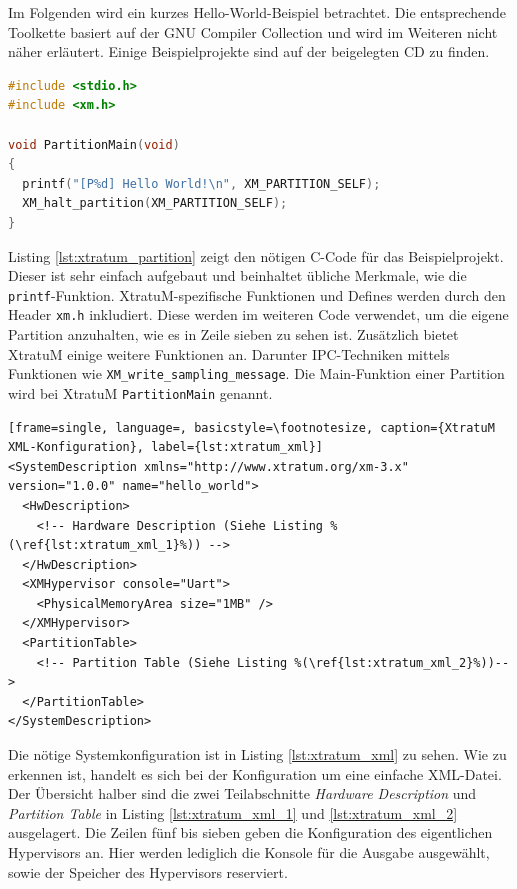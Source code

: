 \documentclass[
  a4paper,					    %
  twoside,
  DIV=calc,     				%
  bibliography=totoc,
  cleardoublepage=empty,
  ngerman,     					%
  final       					%
]{scrbook}
\begin{document}
Im Folgenden wird ein kurzes Hello-World-Beispiel betrachtet. Die entsprechende Toolkette basiert auf der GNU Compiler Collection und wird im Weiteren nicht näher erläutert. Einige Beispielprojekte sind auf der beigelegten CD zu finden.

\begin{lstlisting}[frame=single, language=C, basicstyle=\footnotesize, caption={XtratuM Beispiel Partition}, label={lst:xtratum_partition}]
#include <stdio.h>
#include <xm.h>

void PartitionMain(void)
{
  printf("[P%d] Hello World!\n", XM_PARTITION_SELF);
  XM_halt_partition(XM_PARTITION_SELF);
}
\end{lstlisting}

Listing \ref{lst:xtratum_partition} zeigt den nötigen C-Code für das Beispielprojekt. Dieser ist sehr einfach aufgebaut und beinhaltet übliche Merkmale, wie die \texttt{printf}-Funktion. XtratuM-spezifische Funktionen und Defines werden durch den Header \texttt{xm.h} inkludiert. Diese werden im weiteren Code verwendet, um die eigene Partition anzuhalten, wie es in Zeile sieben zu sehen ist. Zusätzlich bietet XtratuM einige weitere Funktionen an. Darunter IPC-Techniken mittels Funktionen wie \texttt{XM\_write\_sampling\_message}. Die Main-Funktion einer Partition wird bei XtratuM \texttt{PartitionMain} genannt.

\begin{lstlisting}[frame=single, language=, basicstyle=\footnotesize, caption={XtratuM XML-Konfiguration}, label={lst:xtratum_xml}]
<SystemDescription xmlns="http://www.xtratum.org/xm-3.x" version="1.0.0" name="hello_world">
  <HwDescription>
    <!-- Hardware Description (Siehe Listing %(\ref{lst:xtratum_xml_1}%)) -->
  </HwDescription>
  <XMHypervisor console="Uart">
    <PhysicalMemoryArea size="1MB" />
  </XMHypervisor>
  <PartitionTable>
    <!-- Partition Table (Siehe Listing %(\ref{lst:xtratum_xml_2}%))-->
  </PartitionTable>
</SystemDescription>
\end{lstlisting}

Die nötige Systemkonfiguration ist in Listing \ref{lst:xtratum_xml} zu sehen. Wie zu erkennen ist, handelt es sich bei der Konfiguration um eine einfache XML-Datei. Der Übersicht halber sind die zwei Teilabschnitte \emph{Hardware Description} und \emph{Partition Table} in Listing \ref{lst:xtratum_xml_1} und \ref{lst:xtratum_xml_2} ausgelagert. Die Zeilen fünf bis sieben geben die Konfiguration des eigentlichen Hypervisors an. Hier werden lediglich die Konsole für die Ausgabe ausgewählt, sowie der Speicher des Hypervisors reserviert.
\end{document}
